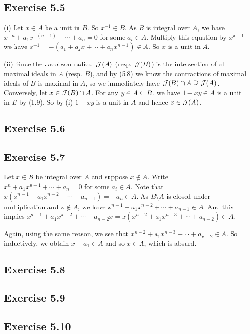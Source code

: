 \documentclass[../A&M.tex]{subfiles}
\begin{document}
\subsection*{Exercise 5.5}

(i) Let $x\in A$ be a unit in $B$. So $x^{-1} \in B$. As $B$ is integral over $A$, we have $x^{-n}+a_1x^{-(n-1)}+\cdots+a_n=0$ for some $a_i\in A$. Multiply this equation by $x^{n-1}$ we have $x^{-1} = -(a_1+a_2x+\cdots+a_nx^{n-1}) \in A$. So $x$ is a unit in $A$.

(ii) Since the Jacobson radical $\mathcal{J}(A)$ (resp. $\mathcal{J}(B)$) is the intersection of all maximal ideals in $A$ (resp. $B$), and by (5.8) we know the contractions of maximal ideals of $B$ is maximal in $A$, so we immediately have $\mathcal{J}(B) \cap A \supseteq \mathcal{J}(A)$. Conversely, let $x \in \mathcal{J}(B) \cap A$. For any $y \in A \subseteq B$, we have $1-xy \in A$ is a unit in $B$ by (1.9). So by (i) $1-xy$ is a unit in $A$ and hence $x \in \mathcal{J}(A)$.

\subsection*{Exercise 5.6}

\subsection*{Exercise 5.7}

Let $x\in B$ be integral over $A$ and suppose $x\notin A$. Write $x^n+a_1x^{n-1}+\cdots+a_n=0$ for some $a_i\in A$. Note that $x(x^{n-1}+a_1x^{n-2}+\cdots+a_{n-1}) = -a_n \in A$. As $B \setminus A$ is closed under multiplication and $x\notin A$, we have $x^{n-1}+a_1x^{n-2}+\cdots+a_{n-1} \in A$. And this implies $x^{n-1}+a_1x^{n-2}+\cdots+a_{n-2}x = x(x^{n-2}+a_1x^{n-3}+\cdots+a_{n-2}) \in A$.

Again, using the same reason, we see that $x^{n-2}+a_1x^{n-3}+\cdots+a_{n-2} \in A$. So inductively, we obtain $x+a_1 \in A$ and so $x \in A$, which is absurd.

\subsection*{Exercise 5.8}

\subsection*{Exercise 5.9}

\subsection*{Exercise 5.10}
\end{document}
